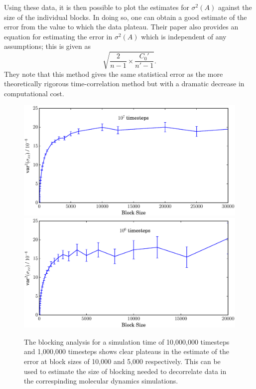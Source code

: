 Using these data, it is then possible to plot the estimates for $\sigma^{2}(A)$ against the size of the individual blocks.
In doing so, one can obtain a good estimate of the error from the value to which the data plateau.
Their paper also provides an equation for estimating the error in $\sigma^{2}(A)$ which is independent of any assumptions; this is given as
$$\sqrt{\frac{2}{n-1} \times \frac{C_{0}'}{n'-1}}.$$
They note that this method gives the same statistical error as the more theoretically rigorous time-correlation method but with a dramatic decrease in computational cost.

\begin{figure}
\centering
        \includegraphics[scale=0.65]{block_average_10e6.eps}
	\\
        \includegraphics[scale=0.65]{block_average_1e6.eps}
	\caption{The blocking analysis for a simulation time of 10,000,000 timesteps and 1,000,000 timesteps shows clear plateaus in the estimate of the error at block sizes of 10,000 and 5,000 respectively.
This can be used to estimate the size of blocking needed to decorrelate data in the correspinding molecular dynamics simulations.}
\label{blocking}
\end{figure}

